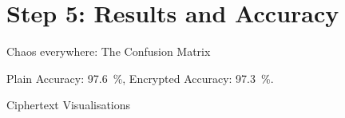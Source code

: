 \section{Step 5: Results and Accuracy}
\begin{frame}{Chaos everywhere: The Confusion Matrix}
  \centering

  \vspace{-0.3cm}
  Plain Accuracy: \SI{97.6}{\percent}, Encrypted Accuracy: \SI{97.3}{\percent}.
\end{frame}

\begin{frame}{Ciphertext Visualisations}
  \begin{figure}[H]
    \centering
    \label{fig:ciphertext-visualisation}
  \end{figure}
\end{frame}
